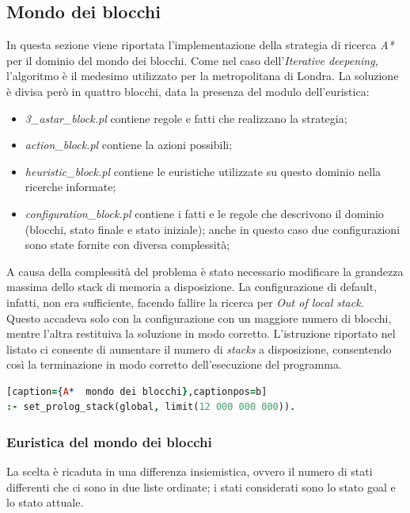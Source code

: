 \documentclass[12pt]{report}
\begin{document}
\subsection{Mondo dei blocchi}
In questa sezione viene riportata l'implementazione della strategia di ricerca \emph{A*} per il dominio del mondo dei blocchi.
Come nel caso dell'\emph{Iterative deepening}, l'algoritmo è il medesimo utilizzato per la metropolitana di Londra.
La soluzione è divisa però in quattro blocchi, data la presenza del modulo dell'euristica:

\begin{itemize}
\item \emph{3\_astar\_block.pl} contiene regole e fatti che realizzano la strategia;
\item \emph{action\_block.pl} contiene la azioni possibili;
\item \emph{heuristic\_block.pl} contiene le euristiche utilizzate su questo dominio nella ricerche informate;
\item \emph{configuration\_block.pl} contiene i fatti e le regole che descrivono il dominio (blocchi, stato finale e stato iniziale); anche in questo caso due configurazioni sono state fornite con diversa complessità;
\end{itemize}

A causa della complessità del problema è stato necessario modificare la grandezza massima dello stack di memoria a disposizione. La configurazione di default, infatti, non era sufficiente, facendo fallire la ricerca per \emph{Out of local stack}.\\
Questo accadeva solo con la configurazione con un maggiore numero di blocchi, mentre l'altra restituiva la soluzione in modo corretto.
L'istruzione riportato nel listato ci consente di aumentare il numero di \emph{stacks} a disposizione, consentendo così la terminazione in modo corretto dell'esecuzione del programma.

\begin{lstlisting}[language=Prolog][caption={A*  mondo dei blocchi},captionpos=b]
:- set_prolog_stack(global, limit(12 000 000 000)).
\end{lstlisting}

\subsubsection{Euristica del mondo dei blocchi}
La scelta è ricaduta in una differenza insiemistica, ovvero il numero di stati differenti che ci sono in due liste ordinate; i stati considerati sono lo stato goal e lo stato attuale.
\end{document}
